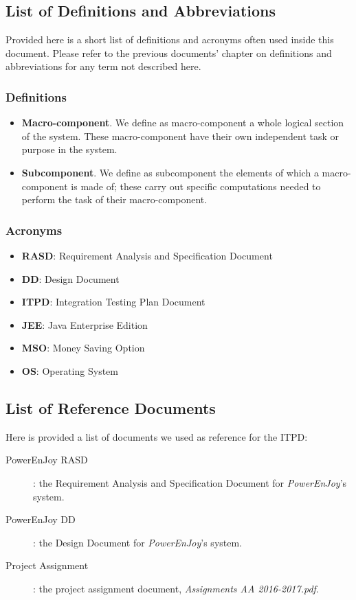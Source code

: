 \subsection{List of Definitions and Abbreviations}
	Provided here is a short list of definitions and acronyms often used inside this document. Please refer to the previous documents' chapter on definitions and abbreviations for any term not described here.
	\subsubsection{Definitions}
		\begin{itemize}
			\item \textbf{Macro-component}. We define as macro-component a whole logical section of the system. These macro-component have their own independent task or purpose in the system. %
			\item \textbf{Subcomponent}. We define as subcomponent the elements of which a macro-component is made of; these carry out specific computations needed to perform the task of their macro-component.
		\end{itemize}
	\subsubsection{Acronyms}
		\begin{itemize}
			\item \textbf{RASD}: Requirement Analysis and Specification Document
			\item \textbf{DD}: Design Document
			\item \textbf{ITPD}: Integration Testing Plan Document
			\item \textbf{JEE}: Java Enterprise Edition
			\item \textbf{MSO}: Money Saving Option
			\item \textbf{OS}: Operating System
		\end{itemize}			
	
	

\subsection{List of Reference Documents}
	Here is provided a list of documents we used as reference for the ITPD:
	
	\begin{description}
		\item[PowerEnJoy RASD]: the Requirement Analysis and Specification Document for \textit{PowerEnJoy}'s system.
		\item[PowerEnJoy DD]: the Design Document for \textit{PowerEnJoy}'s system.
		\item[Project Assignment]: the project assignment document, \textit{Assignments AA 2016-2017.pdf}.
	\end{description}

